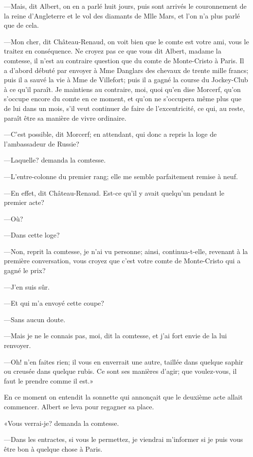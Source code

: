 —Mais, dit Albert, on en a parlé huit jours, puis sont arrivés le couronnement de la reine d'Angleterre et le vol des diamants de Mlle Mars, et l'on n'a plus parlé que de cela. 

—Mon cher, dit Château-Renaud, on voit bien que le comte est votre ami, vous le traitez en conséquence. Ne croyez pas ce que vous dit Albert, madame la comtesse, il n'est au contraire question que du comte de Monte-Cristo à Paris. Il a d'abord débuté par envoyer à Mme Danglars des chevaux de trente mille francs; puis il a sauvé la vie à Mme de Villefort; puis il a gagné la course du Jockey-Club à ce qu'il paraît. Je maintiens au contraire, moi, quoi qu'en dise Morcerf, qu'on s'occupe encore du comte en ce moment, et qu'on ne s'occupera même plus que de lui dans un mois, s'il veut continuer de faire de l'excentricité, ce qui, au reste, paraît être sa manière de vivre ordinaire. 

—C'est possible, dit Morcerf; en attendant, qui donc a repris la loge de l'ambassadeur de Russie? 

—Laquelle? demanda la comtesse. 

—L'entre-colonne du premier rang; elle me semble parfaitement remise à neuf. 

—En effet, dit Château-Renaud. Est-ce qu'il y avait quelqu'un pendant le premier acte? 

—Où? 

—Dans cette loge? 

—Non, reprit la comtesse, je n'ai vu personne; ainsi, continua-t-elle, revenant à la première conversation, vous croyez que c'est votre comte de Monte-Cristo qui a gagné le prix? 

—J'en suis sûr. 

—Et qui m'a envoyé cette coupe? 

—Sans aucun doute. 

—Mais je ne le connais pas, moi, dit la comtesse, et j'ai fort envie de la lui renvoyer. 

—Oh! n'en faites rien; il vous en enverrait une autre, taillée dans quelque saphir ou creusée dans quelque rubis. Ce sont ses manières d'agir; que voulez-vous, il faut le prendre comme il est.» 

En ce moment on entendit la sonnette qui annonçait que le deuxième acte allait commencer. Albert se leva pour regagner sa place. 

«Vous verrai-je? demanda la comtesse. 

—Dans les entractes, si vous le permettez, je viendrai m'informer si je puis vous être bon à quelque chose à Paris. 

